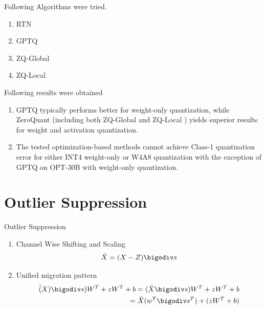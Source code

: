 \documentclass{beamer}
\theoremstyle{plain}
\theoremstyle{definition}
\theoremstyle{remark}
\numberwithin{equation}{section}
\numberwithin{figure}{section}
\numberwithin{theorem}{section}
\begin{document}

\begin{frame}[shrink]
Following Algorithms were tried.
\begin{enumerate}
    \item RTN
    \item GPTQ
    \item ZQ-Global
    \item ZQ-Local
\end{enumerate}
Following results were obtained
\begin{enumerate}
    \item GPTQ typically performs better for weight-only quantization, while
ZeroQuant (including both ZQ-Global and ZQ-Local
) yields superior results for weight and activation
quantization. 
    \item The tested optimization-based methods cannot achieve Class-1 quantization error
for either INT4 weight-only or W4A8 quantization with the exception of GPTQ on OPT-30B with
weight-only quantization.
\end{enumerate}
\end{frame}
\section{Outlier Suppression}

\begin{frame}{Outlier Suppression}
\begin{enumerate}
    \item Channel Wise Shifting and  Scaling
    \begin{align}
        \Tilde{X} = (X - Z) \bigodiv s
    \end{align}
    \item Unified migration pattern
    \begin{align}
    \Tilde(X) \bigodiv s) W^T + zW^T + b = (\Tilde{X} \bigodiv s ) W^T + zW^T + b \\
    = \Tilde{X} (w^T \bigodiv s^T) + (zW^T + b)
    \end{align}
\end{enumerate}
\end{frame}
\end{document}
